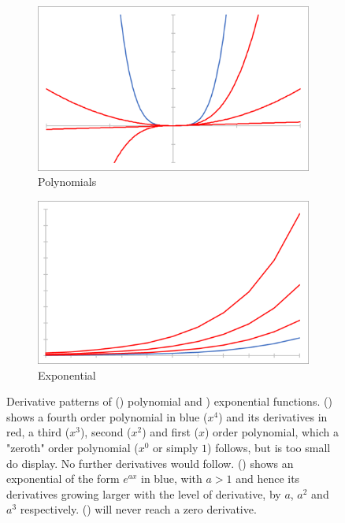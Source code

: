 \documentclass[main.tex]{subfiles}
\begin{document}
    \begin{figure}[h]
      \begin{subfigure}{0.48\linewidth}
        \centering
        \includegraphics[width=0.9\linewidth]{figures/derivPoly}
        \caption{Polynomials}
        \label{fig:deriv:poly}
      \end{subfigure}
      \begin{subfigure}{0.48\linewidth}
        \centering
        \includegraphics[width=0.9\linewidth]{figures/derivExp}
        \caption{Exponential}
        \label{fig:deriv:exp}
      \end{subfigure}
      \caption{Derivative patterns of () polynomial and ) exponential functions. () shows a fourth order polynomial in blue ($x^4$) and its derivatives in red, a third ($x^3$), second ($x^2$) and first ($x$) order polynomial, which a "zeroth" order polynomial ($x^0$ or simply $1$) follows, but is too small do display. No further derivatives would follow. () shows an exponential of the form $e^{a x}$ in blue, with $a>1$ and hence its derivatives growing larger with the level of derivative, by $a$, $a^2$ and $a^3$ respectively. () will never reach a zero derivative.}
      \label{fig:deriv}
    \end{figure}
    
\end{document}
